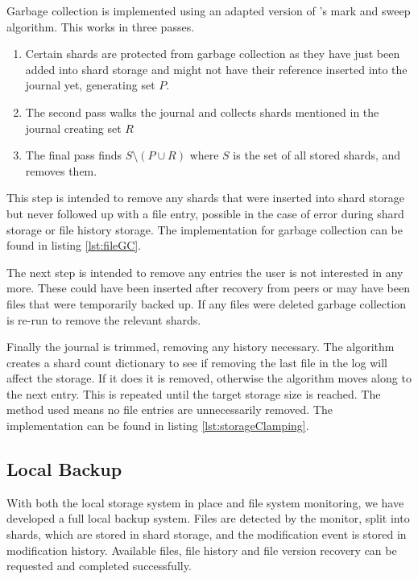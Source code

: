 \documentclass[11pt, a4paper, twoside]{report}
\begin{document}
Garbage collection is implemented using an adapted version of \cite{dijkstra1978fly}'s mark and sweep algorithm. This works in three passes. 

\begin{enumerate}
 \item Certain shards are protected from garbage collection as they have just been added into shard storage and might not have their reference inserted into the journal yet, generating set $P$.
 \item The second pass walks the journal and collects shards mentioned in the journal creating set $R$
 \item The final pass finds $S \setminus (P \cup R)$ where $S$ is the set of all stored shards, and removes them.
\end{enumerate}

This step is intended to remove any shards that were inserted into shard storage but never followed up with a file entry, possible in the case of error during shard storage or file history storage. The implementation for garbage collection can be found in listing \ref{lst:fileGC}.

The next step is intended to remove any entries the user is not interested in any more. These could have been inserted after recovery from peers or may have been files that were temporarily backed up. If any files were deleted garbage collection is re-run to remove the relevant shards.

Finally the journal is trimmed, removing any history necessary. The algorithm creates a shard count dictionary to see if removing the last file in the log will affect the storage. If it does it is removed, otherwise the algorithm moves along to the next entry. This is repeated until the target storage size is reached. The method used means no file entries are unnecessarily removed. The implementation can be found in listing \ref{lst:storageClamping}.

\subsection{Local Backup}

With both the local storage system in place and file system monitoring, we have developed a full local backup system. Files are detected by the monitor, split into shards, which are stored in shard storage, and the modification event is stored in modification history. Available files, file history and file version recovery can be requested and completed successfully.
\end{document}
